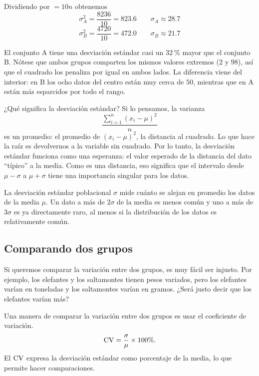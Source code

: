 Dividiendo por \( = 10n\) obtenemos
\[
\sigma^2_A = \frac{8236}{10} = \num{823,6} \qquad \sigma_A \approx \num{28,7}
\]
\[
\sigma^2_B = \frac{4720}{10} = \num{472,0} \qquad \sigma_B \approx \num{21,7}
\]


El conjunto A tiene una desviación estándar casi un \(\qty{32}{\percent}\) mayor que el conjunto B. Nótese que ambos grupos comparten los mismos valores extremos (\(2\) y \(98\)), así que el cuadrado los penaliza por igual en ambos lados. La diferencia viene del interior: en B los ocho datos del centro están muy cerca de \(50\), mientras que en A están más esparcidos por todo el rango.

¿Qué significa la desviación estándar? Si lo pensamos, la varianza \[\frac{\sum_{i=1}^n \left(x_i-\mu\right)^2}{n}\] es un promedio: el promedio de \(\left(x_i-\mu\right)^2\), la distancia al cuadrado. Lo que hace la raíz es devolvernos a la variable sin cuadrado. Por lo tanto, la desviación estándar funciona como una esperanza: el valor esperado de la distancia del dato \enquote{típico} a la media. Como es una distancia, eso significa que el intervalo desde \(\mu-\sigma\) a \(\mu+\sigma\) tiene una importancia singular para los datos.

\begin{remark}
La desviación estándar poblacional \(\sigma\) mide cuánto se alejan en promedio los datos de la media \(\mu\). Un dato a más de \(2\sigma\) de la media es menos común y uno a más de \(3\sigma\) es ya directamente raro, al menos si la distribución de los datos es relativamente común.
\end{remark}

\subsection{Comparando dos grupos}

Si queremos comparar la variación entre dos grupos, es muy fácil ser injusto. Por ejemplo, los elefantes y los saltamontes tienen pesos variados, pero los elefantes varían en toneladas y los saltamontes varían en gramos. ¿Será justo decir que los elefantes varían más?

Una manera de comparar la variación entre dos grupos es usar el coeficiente de variación.
\[
\operatorname{CV} = \frac{\sigma}{\mu} \times 100\%.
\]
El \(\operatorname{CV}\) expresa la desviación estándar como porcentaje de la media, lo que permite hacer comparaciones.

